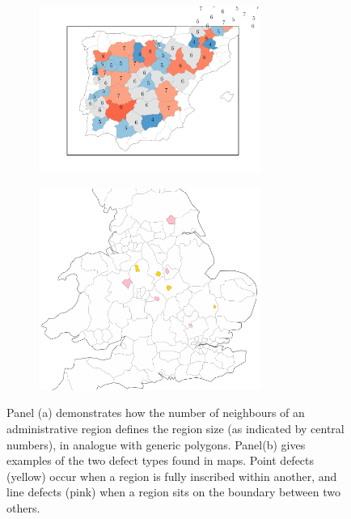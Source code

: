\begin{figure}[tb]
	\centering
     
          \begin{subfigure}[b]{0.48\textwidth}
         \centering
         \includegraphics[width=0.8\textwidth]{./appendices/figures/region_count.pdf}
         \caption{}
         \label{appfig:mapdefb}
     \end{subfigure}
     \hfill
      \begin{subfigure}[b]{0.48\textwidth}
         \centering
         \includegraphics[width=0.8\textwidth]{./appendices/figures/map_defects.pdf}
         \caption{}
         \label{appfig:mapdefa}
     \end{subfigure}
     \hfill

	\caption{Panel (a) demonstrates how the number of neighbours of an administrative region defines the region size (as indicated by central numbers), in analogue with generic polygons. Panel(b) gives examples of the two defect types found in maps. Point defects (yellow) occur when a region is fully inscribed within another, and line defects (pink) when a region sits on the boundary between two others.}
	\label{appfig:mapdefects}
\end{figure}

